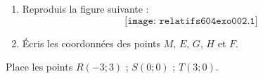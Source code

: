 \begin{myenumerate}
\item
\begin{enumerate}
\item Reproduis la figure suivante :
\[\texttt{[image: relatifs604exo002.1]}\]
\item \'Ecris les coordonnées des points $M$, $E$, $G$, $H$ et $F$.
\end{enumerate}
\item Place les points $R(-3;3)$ ; $S(0;0)$ ; $T(3;0)$.
\end{myenumerate}
